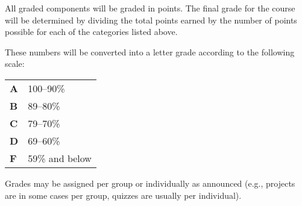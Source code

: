 All graded components will be graded in points. The final grade for the course will be determined by dividing the total points earned by the number of points possible for each of the categories listed above. 

These numbers will be converted into a letter grade according to the following scale: 
    \smallskip
    
\begin{tabular}{ll}
    \textbf{A} & 100--90\%\\
    \textbf{B} & 89--80\%\\
    \textbf{C} & 79--70\%\\
    \textbf{D} & 69--60\%\\
    \textbf{F} & 59\% and below 
\end{tabular}
    \smallskip
    

Grades may be assigned per group or individually as announced (e.g., projects are in some cases per group, quizzes are usually per individual).
